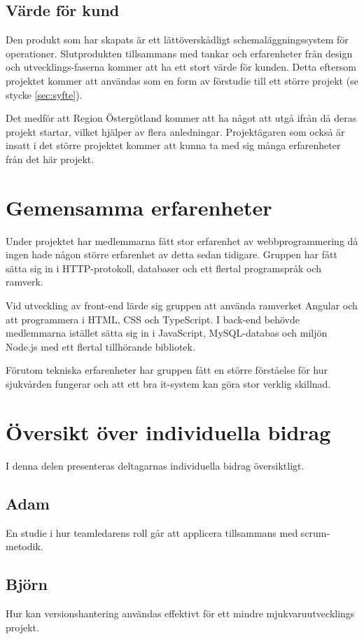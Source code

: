 \subsection{Värde för kund}
Den produkt som har skapats är ett lättöverskådligt schemaläggningssystem för operationer. Slutprodukten tillsammans med tankar och erfarenheter från design och utvecklings-faserna kommer att ha ett stort värde för kunden. Detta eftersom projektet kommer att användas som en form av förstudie till ett större projekt (se stycke \ref{sec:syfte}).

Det medför att Region Östergötland kommer att ha något att utgå ifrån då deras projekt startar, vilket hjälper av flera anledningar. Projektägaren som också är insatt i det större projektet kommer att kunna ta med sig många erfarenheter från det här projekt.

\section{Gemensamma erfarenheter}
Under projektet har medlemmarna fått stor erfarenhet av webbprogrammering då ingen hade någon större erfarenhet av detta sedan tidigare. Gruppen har fått sätta sig in i HTTP-protokoll, databaser och ett flertal programspråk och ramverk.

Vid utveckling av front-end lärde sig gruppen att använda ramverket Angular och att programmera i HTML, CSS och TypeScript. I back-end behövde medlemmarna istället sätta sig in i JavaScript, MySQL-databas och miljön Node.js med ett flertal tillhörande bibliotek.

Förutom tekniska erfarenheter har gruppen fått en större förståelse för hur sjukvården fungerar och att ett bra it-system kan göra stor verklig skillnad.

\section{Översikt över individuella bidrag}
I denna delen presenteras deltagarnas individuella bidrag översiktligt.

\subsection{Adam}
En studie i hur teamledarens roll går att applicera tillsammans med scrum-metodik.
\subsection{Björn}
Hur kan versionshantering användas effektivt för ett mindre mjukvaruutvecklings projekt.

